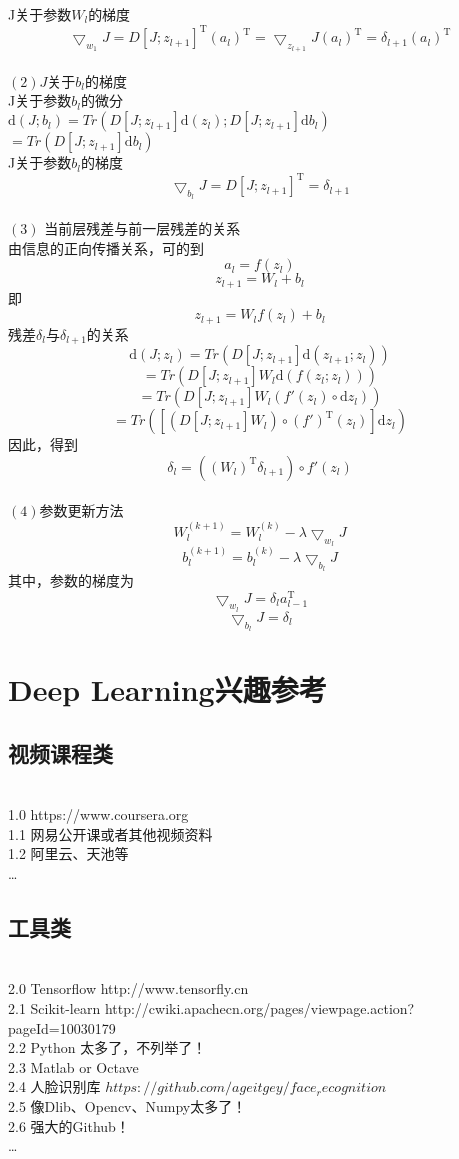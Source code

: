 \documentclass[UFT8]{ctexart}
\begin{document}
J关于参数$W_{l}$的梯度
\[ \bigtriangledown_{w_{1}}J = D[J;z_{l+1}]^\mathrm{T}(a_{l})^\mathrm{T} = \bigtriangledown_{z_{l+1}}J(a_{l})^\mathrm{T} = \delta_{l+1}(a_{l})^\mathrm{T}\]
~\\
$(2) J$关于$b_{l}$的梯度 \\
J关于参数$b_{l}$的微分\\
$\mathrm{d}(J;b_{l}) = Tr(D[J;z_{l+1}]\mathrm{d}(z_{l});D[J;z_{l+1}]\mathrm{d}b_{l})$ \\
$ = Tr(D[J;z_{l+1}]\mathrm{d} b_{l})$ \\
J关于参数$b_{l}$的梯度
\[ \bigtriangledown_{b_{l}}J = D[J;z_{l+1}]^\mathrm{T} = \delta_{l+1} \]
~\\
$(3)$ 当前层残差与前一层残差的关系 \\
由信息的正向传播关系，可的到
\[ a_{l} = f(z_{l}) \] 
\[ z_{l+1} = W_{l} + b_{l} \] 
即 
\[ z_{l+1} = W_{l}f(z_{l}) + b_{l} \]  
残差$\delta_{l}$与$\delta_{l+1}$的关系  
\[ \mathrm{d}(J;z_{l}) = Tr(D[J;z_{l+1}]\mathrm{d}(z_{l+1};z_{l})) \]
\[ = Tr(D[J;z_{l+1}]W_{l}\mathrm{d}(f(z_{l};z_{l}))) \]
\[ = Tr(D[J;z_{l+1}]W_{l}(f'(z_{l}) \circ \mathrm{d}z_{l})) \]
\[ = Tr([(D[J;z_{l+1}]W_{l}) \circ (f')^\mathrm{T}(z_{l})]\mathrm{d}z_{l}) \]
因此，得到
\[ \delta_{l} = ((W_{l})^\mathrm{T}\delta_{l+1}) \circ f'(z_{l}) \] 
~\\
$(4)$参数更新方法 \\
\[ W_{l}^{(k+1)} = W_{l}^{(k)} - \lambda \bigtriangledown_{w_{l}}J \]
\[ b_{l}^{(k+1)} = b_{l}^{(k)} - \lambda \bigtriangledown_{b_{l}}J \]
其中，参数的梯度为
\[ \bigtriangledown_{w_{l}}J = \delta_{l}a_{l-1}^\mathrm{T} \]
\[ \bigtriangledown_{b_{l}}J = \delta_{l} \]
\newpage
\section{Deep Learning兴趣参考}
\subsection{视频课程类}
~\\
1.0	https://www.coursera.org \\
1.1	网易公开课或者其他视频资料\\
1.2	阿里云、天池等\\
\ldots
~\\
\subsection{工具类 }
~\\
2.0 	Tensorflow http://www.tensorfly.cn\\
2.1	Scikit-learn http://cwiki.apachecn.org/pages/viewpage.action?pageId=10030179\\
2.2	Python 太多了，不列举了！\\
2.3	Matlab or Octave \\
2.4	人脸识别库 $https://github.com/ageitgey/face_recognition$\\
2.5	像Dlib、Opencv、Numpy太多了！\\
2.6	强大的Github！\\
\ldots
~\\
\end{document}
